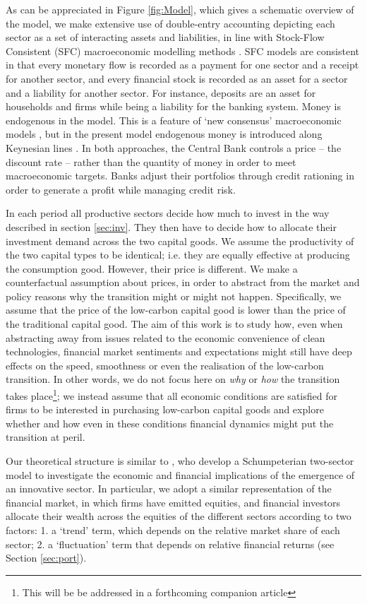 \documentclass[authoryear]{article}
\begin{document}
As can be appreciated in Figure \ref{fig:Model}, which gives a schematic overview of the model, we make extensive use of double-entry accounting depicting each sector as a set of interacting assets and liabilities, in line with Stock-Flow Consistent (SFC) macroeconomic modelling methods \citep{Caverzasi2015, Godley:2007}. SFC models are consistent in that every monetary flow is recorded as a payment for one sector and a receipt for another sector, and every financial stock is recorded as an asset for a sector and a liability for another sector. For instance, deposits are an asset for households and firms while being a liability for the banking system. Money is endogenous in the model. This is a feature of `new consensus' macroeconomic models \citep{meyer_does_2001}, but in the present model endogenous money is introduced along Keynesian lines \citep{arestis_nature_2006}. In both approaches, the Central Bank controls a price -- the discount rate -- rather than the quantity of money in order to meet macroeconomic targets. Banks adjust their portfolios through credit rationing in order to generate a profit while managing credit risk.

In each period all productive sectors decide how much to invest in the way described in section \ref{sec:inv}. They then have to decide how to allocate their investment demand across the two capital goods. We assume the productivity of the two capital types to be identical; i.e. they are equally effective at producing the consumption good. However, their price is different. We make a counterfactual assumption about prices, in order to abstract from the market and policy reasons why the transition might or might not happen. Specifically, we assume that the price of the low-carbon capital good is lower than the price of the traditional capital good. The aim of this work is  to study how, even when abstracting away from issues related to the economic convenience of clean technologies, financial market sentiments and expectations might still have deep effects on the speed, smoothness or even the realisation of the low-carbon transition. In other words, we do not focus here on \emph{why} or \emph{how} the transition takes place\footnote{This will be be addressed in a forthcoming companion article}; we instead assume that all economic conditions are satisfied for firms to be interested in purchasing low-carbon capital goods and explore whether and how even in these conditions financial dynamics might put the transition at peril.

Our  theoretical structure is similar to \citet{Caiani2014}, who develop a Schumpeterian two-sector model to investigate the economic and financial implications of the emergence of an innovative sector. In particular, we adopt a similar representation of the financial market, in which firms have emitted equities, and financial investors allocate their wealth across the equities of the different sectors according to two factors: 1. a `trend' term, which depends on the relative market share of each sector; 2. a `fluctuation' term that depends on relative financial returns (see Section \ref{sec:port}). 
\end{document}
